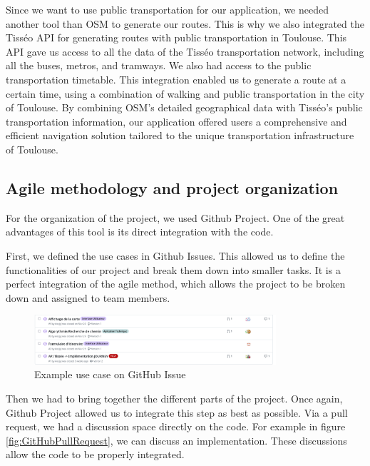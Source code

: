 Since we want to use public transportation for our application, we needed another tool than OSM to generate our routes. This is why we also integrated the Tisséo API for generating routes with public transportation in Toulouse. This API gave us access to all the data of the Tisséo transportation network, including all the buses, metros, and tramways. We also had access to the public transportation timetable. This integration enabled us to generate a route at a certain time, using a combination of walking and public transportation in the city of Toulouse. By combining OSM's detailed geographical data with Tisséo's public transportation information, our application offered users a comprehensive and efficient navigation solution tailored to the unique transportation infrastructure of Toulouse.


\subsection{Agile methodology and project organization}


For the organization of the project, we used Github Project. One of the great advantages of this tool is its direct integration with the code.


First, we defined the use cases in Github Issues. This allowed us to define the functionalities of our project and break them down into smaller tasks. It is a perfect integration of the agile method, which allows the project to be broken down and assigned to team members.


\begin{figure}[h]
    \centering
    \includegraphics[width=0.8\textwidth]{img/GitHubUseCase}
    \caption{Example use case on GitHub Issue}
    \label{fig:GitHubUseCase}
\end{figure}


Then we had to bring together the different parts of the project. Once again, Github Project allowed us to integrate this step as best as possible. Via a pull request, we had a discussion space directly on the code. For example in figure \ref{fig:GitHubPullRequest}, we can discuss an implementation. These discussions allow the code to be properly integrated.


